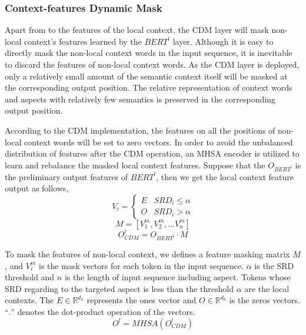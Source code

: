 \documentclass[a4paper,fleqn]{cas-sc}
\begin{document}
\subsubsection{Context-features Dynamic Mask}

Apart from to the features of the local context, the CDM layer will mask non-local context's features learned by the $BERT^l$ layer. Although it is easy to directly mask the non-local context words in the input sequence, it is inevitable to discard the features of non-local context words. As the CDM layer is deployed, only a relatively small amount of the semantic context itself will be masked at the corresponding output position. The relative representation of context words and aspects with relatively few semantics is preserved in the corresponding output position.

According to the CDM implementation, the features on all the positions of non-local context words will be set to zero vectors. In order to avoid the unbalanced distribution of features after the CDM operation, an MHSA encoder is utilized to learn and rebalance the masked local context features. Suppose that the $O_{BERT^l}$ is the preliminary output features of $BERT^l$, then we get the local context feature output as follows,
\begin{equation}
V_{i}=\left\{\begin{array}{ll}{E} & {SRD_{i} \leq \alpha} \\ {O} & {SRD_{i}>\alpha}\end{array}\right.
\end{equation}
\begin{equation}
M=\left[V_{1}^{m}, V_{2}^{m}, \ldots V_{n}^{m}\right]
\end{equation}
\begin{equation}
O_{C D M}^{l}=O_{BERT^l} \cdot M
\end{equation}

To mask the features of non-local context, we defines a feature masking matrix $M$, and $ V_{i}^{m} $ is the mask vectors for each token in the input sequence. $\alpha$ is the SRD threshold and $n$ is the length of input sequence including aspect. Tokens whose SRD regarding to the targeted aspect is less than the threshold $\alpha$ are the local contexts. The $E \in \mathbb{R}^{d_{h}}$ represents the ones vector and $O \in \mathbb{R}^{d_{h}}$ is the zeros vectors. ``$.$'' denotes the dot-product operation of the vectors.
\begin{equation}
O^{l}=M H S A\left(O_{C D M}^{l}\right)
\end{equation}
\end{document}
